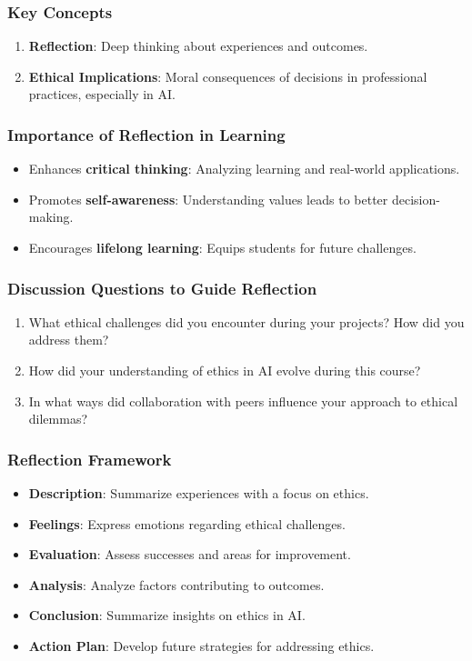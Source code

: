 \documentclass[aspectratio=169]{beamer}
\begin{document}
\begin{frame}[fragile]
    \frametitle{Key Concepts}
    \begin{enumerate}
        \item \textbf{Reflection}: Deep thinking about experiences and outcomes.
        \item \textbf{Ethical Implications}: Moral consequences of decisions in professional practices, especially in AI.
    \end{enumerate}
\end{frame}

\begin{frame}[fragile]
    \frametitle{Importance of Reflection in Learning}
    \begin{itemize}
        \item Enhances \textbf{critical thinking}: Analyzing learning and real-world applications.
        \item Promotes \textbf{self-awareness}: Understanding values leads to better decision-making.
        \item Encourages \textbf{lifelong learning}: Equips students for future challenges.
    \end{itemize}
\end{frame}

\begin{frame}[fragile]
    \frametitle{Discussion Questions to Guide Reflection}
    \begin{enumerate}
        \item What ethical challenges did you encounter during your projects? How did you address them?
        \item How did your understanding of ethics in AI evolve during this course?
        \item In what ways did collaboration with peers influence your approach to ethical dilemmas?
    \end{enumerate}
\end{frame}

\begin{frame}[fragile]
    \frametitle{Reflection Framework}
    \begin{itemize}
        \item \textbf{Description}: Summarize experiences with a focus on ethics.
        \item \textbf{Feelings}: Express emotions regarding ethical challenges.
        \item \textbf{Evaluation}: Assess successes and areas for improvement.
        \item \textbf{Analysis}: Analyze factors contributing to outcomes.
        \item \textbf{Conclusion}: Summarize insights on ethics in AI.
        \item \textbf{Action Plan}: Develop future strategies for addressing ethics.
    \end{itemize}
\end{frame}
\end{document}
